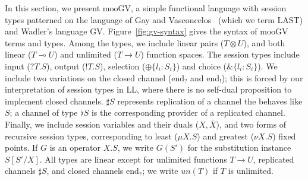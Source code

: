 \documentclass[orivec,envcountsame]{llncs}
\newcommand{\with}{\mathbin\binampersand}
\newcommand{\gvdual}[1]{\overline{#1}}
\newcommand{\gvout}[2]{{!#1.#2}}
\newcommand{\gvin}[2]{{?#1.#2}}
\newcommand{\lto}{\ensuremath{\multimap}}
\newcommand{\uto}{\ensuremath{\rightarrow}}
\newcommand{\outterm}{\mathrm{end}_!}
\newcommand{\interm}{\mathrm{end}_?}
\newcommand{\gvserver}[1]{\flat #1}
\newcommand{\gvservice}[1]{\sharp #1}
\newcommand{\mugv}{$\mathrm{mooGV}$\xspace}
\begin{document}
In this section, we present \mugv, a simple functional language with session types patterned on the
language of Gay and Vasconcelos~\cite{GayVasconcelos10} (which we term LAST) and Wadler's language GV.
Figure~\ref{fig:gv-syntax} gives the syntax of \mugv terms and types.  Among the types, we include
linear pairs ($T \otimes U$), and both linear ($T \lto U$) and unlimited ($T \uto U$) function
spaces.  The session types include input ($\gvin{T}{S}$), output ($\gvout{T}{S}$), selection
($\oplus\{ l_i:S_i \}$) and choice ($\with\{l_i:S_i\}$).  We include two variations on the closed
channel ($\interm$ and $\outterm$); this is forced by our interpretation of session types in LL,
where there is no self-dual proposition to implement closed channels.  $\gvservice{S}$ represents
replication of a channel the behaves like $S$; a channel of type $\gvserver{S}$ is the corresponding
provider of a replicated channel.  Finally, we include session variables and their duals
($X,\gvdual{X}$), and two forms of recursive session types, corresponding to least ($\mu X.S$) and
greatest ($\nu X.S$) fixed points.  If $G$ is an operator $X.S$, we write $G(S')$ for the
substitution instance $S[S'/X]$.  All types are linear except for unlimited functions $T \uto U$,
replicated channels $\gvservice{S}$, and closed channels $\interm$; we write $un(T)$ if $T$ is
unlimited.
\end{document}

